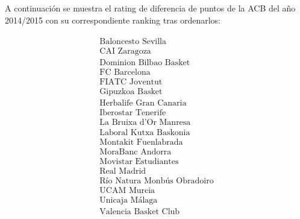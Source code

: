\begin{ejem} A continuación se muestra el rating de diferencia de puntos de la ACB del año 2014/2015 con su correspondiente ranking tras ordenarlos:
\end{ejem}	
	\[
	\begin{array}{ccc}
	\begin{array}{c}
	\text{Baloncesto Sevilla}\\
	\text{CAI Zaragoza} \\
	\text{Dominion Bilbao Basket} \\
	\text{FC Barcelona} \\
	\text{FIATC Joventut} \\
	\text{Gipuzkoa Basket} \\
	\text{Herbalife Gran Canaria} \\
	\text{Iberostar Tenerife} \\
	\text{La Bruixa d'Or Manresa} \\
	\text{Laboral Kutxa Baskonia} \\
	\text{Montakit Fuenlabrada} \\
	\text{MoraBanc Andorra} \\
	\text{Movistar Estudiantes} \\
	\text{Real Madrid} \\
	\text{Río Natura Monbús Obradoiro} \\
	\text{UCAM Murcia} \\
	\text{Unicaja Málaga} \\
	\text{Valencia Basket Club}
	

\end{array}
\end{array}\]
